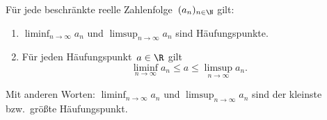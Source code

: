 \documentclass[a4paper]{article}
\begin{document}
\begin{theorem}
    Für jede beschränkte reelle Zahlenfolge~$(a_n)_{n\in\N}$ gilt:
    \begin{enumerate}
        \item $\liminf_{n\to\infty} a_n$ und $\limsup_{n\to\infty} a_n$ sind Häufungspunkte.
        \item Für jeden Häufungspunkt~$a \in \R$ gilt
              \begin{equation*}
                  \liminf_{n\to\infty} a_n \leq a \leq \limsup_{n\to\infty} a_n.
              \end{equation*}
    \end{enumerate}
    Mit anderen Worten: $\liminf_{n\to\infty} a_n$ und $\limsup_{n\to\infty} a_n$ sind der kleinste bzw.\ größte Häufungspunkt.
\end{theorem}
\end{document}
